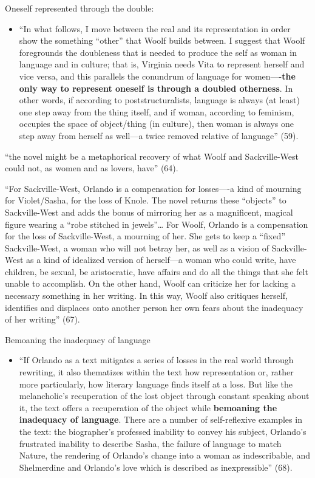 \documentclass[11pt]{article}
\begin{document}
Oneself represented through the double:
\begin{itemize}
\item “In what follows, I move between the real and its representation in
order show the something “other” that Woolf builds between. I
suggest that Woolf foregrounds the doubleness that is needed to
produce the self as woman in language and in culture; that is,
Virginia needs Vita to represent herself and vice versa, and this
parallels the conundrum of language for women—-\textbf{the only way to
represent oneself is through a doubled otherness}. In other words,
if according to poststructuralists, language is always (at least)
one step away from the thing itself, and if woman, according to
feminism, occupies the space of object/thing (in culture), then
woman is always one step away from herself as well—a twice removed
relative of language” (59).
\end{itemize}

“the novel might be a metaphorical recovery of what Woolf and
Sackville-West could not, as women and as lovers, have” (64).

“For Sackville-West, Orlando is a compensation for losses—-a kind of
mourning for Violet/Sasha, for the loss of Knole. The novel returns
these “objects” to Sackville-West and adds the bonus of mirroring her
as a magnificent, magical figure wearing a “robe stitched in
jewels”\ldots{} For Woolf, Orlando is a compensation for the loss of
Sackville-West, a mourning of her. She gets to keep a “fixed”
Sackville-West, a woman who will not betray her, as well as a vision
of Sackville-West as a kind of idealized version of herself—a woman
who could write, have children, be sexual, be aristocratic, have
affairs and do all the things that she felt unable to accomplish. On
the other hand, Woolf can criticize her for lacking a necessary
something in her writing. In this way, Woolf also critiques herself,
identifies and displaces onto another person her own fears about the
inadequacy of her writing” (67).

Bemoaning the inadequacy of language
\begin{itemize}
\item “If Orlando as a text mitigates a series of losses in the real world
through rewriting, it also thematizes within the text how
representation or, rather more particularly, how literary language
finds itself at a loss. But like the melancholic’s recuperation of
the lost object through constant speaking about it, the text offers
a recuperation of the object while \textbf{bemoaning the inadequacy of
language}. There are a number of self-reflexive examples in the
text: the biographer’s professed inability to convey his subject,
Orlando’s frustrated inability to describe Sasha, the failure of
language to match Nature, the rendering of Orlando’s change into a
woman as indescribable, and Shelmerdine and Orlando’s love which is
described as inexpressible” (68).
\end{itemize}
\end{document}
